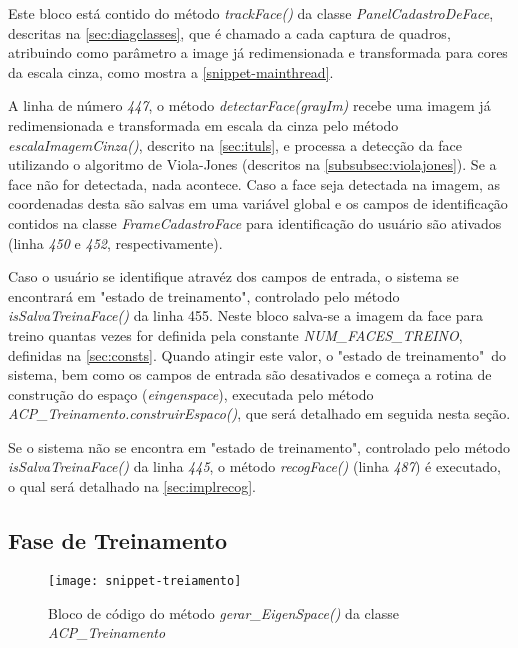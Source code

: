 \codigoPython




Este bloco está contido do método \textit{trackFace()} da classe \textit{PanelCadastroDeFace}, descritas na \autoref{sec:diagclasses}, que é chamado a cada captura de quadros, atribuindo como parâmetro a image já redimensionada e transformada para cores da escala cinza, como mostra a  \autoref{snippet-mainthread}.

A linha de número \textit{447}, o método \textit{detectarFace(grayIm)} recebe uma imagem já redimensionada e transformada em escala da cinza pelo método \textit{escalaImagemCinza()}, descrito na \autoref{sec:ituls}, e processa a detecção da face utilizando o algoritmo de Viola-Jones (descritos na \autoref{subsubsec:violajones}). Se a face não for detectada, nada acontece. Caso a face seja detectada na imagem, as coordenadas desta são salvas em uma variável global e os campos de identificação contidos na classe \textit{FrameCadastroFace} para identificação do usuário são ativados  (linha \textit{450} e \textit{452}, respectivamente). 

Caso o usuário se identifique atravéz dos campos de entrada, o sistema se encontrará em "estado de treinamento", controlado pelo método \textit{isSalvaTreinaFace()} da linha 455. Neste bloco salva-se a imagem da face para treino quantas vezes for definida pela constante \textit{NUM\_FACES\_TREINO}, definidas na \autoref{sec:consts}. Quando atingir este valor, o "estado de treinamento"\ do sistema, bem como os campos de entrada são desativados e começa a rotina de construção do espaço (\textit{eingenspace}), executada pelo método \textit{ACP\_Treinamento.construirEspaco()}, que será detalhado em seguida nesta seção.

Se o sistema não se encontra em "estado de treinamento", controlado pelo método \textit{isSalvaTreinaFace()} da linha \textit{445}, o método \textit{recogFace()} (linha \textit{487}) é executado, o qual será detalhado na \autoref{sec:implrecog}.


\subsection{Fase de Treinamento}\label{sec:impltrein}

\begin{figure}[h]
	\centering
	\texttt{[image: snippet-treiamento]}
	\caption{Bloco de código do método \textit{gerar\_EigenSpace()} da classe \textit{ACP\_Treinamento}}
	\label{snippet-treiamento}
\end{figure}


